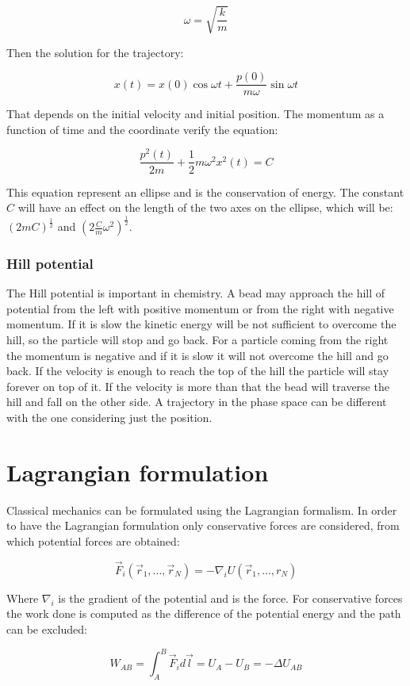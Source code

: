 		$$\omega = \sqrt{\frac{k}{m}}$$

		Then the solution for the trajectory:

		$$x(t) = x(0)\cos\omega t+ \frac{p(0)}{m\omega}\sin\omega t$$

		That depends on the initial velocity and initial position.
		The momentum as a function of time and the coordinate verify the equation:

		$$\frac{p^2(t)}{2m} +\frac{1}{2}m\omega^2x^2(t) = C$$

		This equation represent an ellipse and is the conservation of energy.
		The constant $C$ will have an effect on the length of the two axes on the ellipse, which will be: $(2mC)^{\frac{1}{2}}$ and $(2\frac{C}{m}\omega^2)^{\frac{1}{2}}$.

		\subsubsection{Hill potential}
		The Hill potential is important in chemistry.
		A bead may approach the hill of potential from the left with positive momentum or from the right with negative momentum.
		If it is slow the kinetic energy will be not sufficient to overcome the hill, so the particle will stop and go back.
		For a particle coming from the right the momentum is negative and if it is slow it will not overcome the hill and go back.
		If the velocity is enough to reach the top of the hill the particle will stay forever on top of it.
		If the velocity is more than that the bead will traverse the hill and fall on the other side.
		A trajectory in the phase space can be different with the one considering just the position.

\section{Lagrangian formulation}
Classical mechanics can be formulated using the Lagrangian formalism.
In order to have the Lagrangian formulation only conservative forces are considered, from which potential forces are obtained:

$$\vec{F}_i(\vec{r}_1, \dots, \vec{r}_N) = -\nabla_i U(\vec{r}_1, \dots, r_N)$$

Where $\nabla_i$ is the gradient of the potential and is the force.
For conservative forces the work done is computed as the difference of the potential energy and the path can be excluded:

$$W_{AB} = \int_A^B\vec{F}_id\vec{l} = U_A-U_B = -\Delta U_{AB}$$

